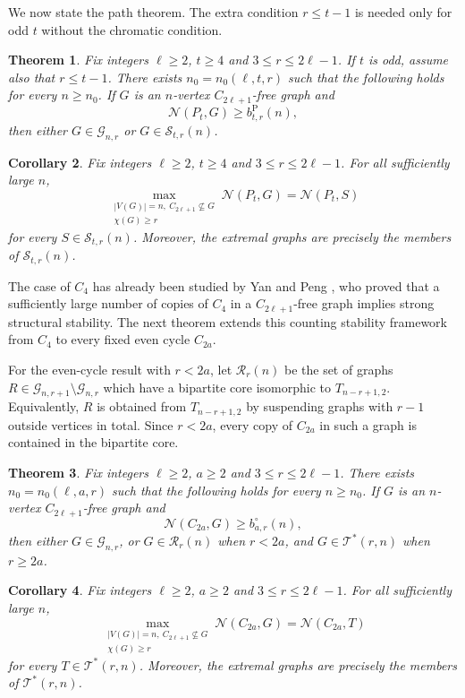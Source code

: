 \documentclass[11pt]{article}
\newtheorem{theorem}{Theorem}[section]
\newtheorem{corollary}[theorem]{Corollary}
\theoremstyle{definition}
\theoremstyle{plain}
\theoremstyle{remark}
\theoremstyle{plain}
\numberwithin{equation}{section}
\newcommand{\cG}{\mathcal G}
\newcommand{\cS}{\mathcal S}
\newcommand{\cT}{\mathcal T}
\newcommand{\cR}{\mathcal R}
\newcommand{\N}{\mathcal N}
\begin{document}
We now state the path theorem. The extra condition $r\le t-1$ is needed only for odd $t$ without the chromatic condition.

\begin{theorem}\label{thm:path-main}
Fix integers $\ell\ge2$, $t\ge4$ and $3\le r\le2\ell-1$. If $t$ is odd, assume also that $r\le t-1$. There exists $n_0=n_0(\ell,t,r)$ such that the following holds for every $n\ge n_0$. If $G$ is an $n$-vertex $C_{2\ell+1}$-free graph and
\[
        \N(P_t,G)\ge b^{\mathrm P}_{t,r}(n),
\]
then either $G\in\cG_{n,r}$ or $G\in\cS_{t,r}(n)$.
\end{theorem}

\begin{corollary}\label{cor:path-chromatic}
Fix integers $\ell\ge2$, $t\ge4$ and $3\le r\le2\ell-1$. For all sufficiently large $n$,
\[
        \max_{\substack{|V(G)|=n,\ C_{2\ell+1}\nsubseteq G\\ \chi(G)\ge r}} \N(P_t,G)=\N(P_t,S)
\]
for every $S\in\cS_{t,r}(n)$. Moreover, the extremal graphs are precisely the members of $\cS_{t,r}(n)$.
\end{corollary}

The case of $C_4$ has already been studied by Yan and Peng \cite{YanPengC42026}, who proved that a sufficiently large number of copies of $C_4$ in a $C_{2\ell+1}$-free graph implies strong structural stability. The next theorem extends this counting stability framework from $C_4$ to every fixed even cycle $C_{2a}$.

For the even-cycle result with $r<2a$, let $\cR_r(n)$ be the set of graphs $R\in\cG_{n,r+1}\setminus\cG_{n,r}$ which have a bipartite core isomorphic to $T_{n-r+1,2}$. Equivalently, $R$ is obtained from $T_{n-r+1,2}$ by suspending graphs with $r-1$ outside vertices in total. Since $r<2a$, every copy of $C_{2a}$ in such a graph is contained in the bipartite core.

\begin{theorem}\label{thm:cycle-main}
Fix integers $\ell\ge2$, $a\ge2$ and $3\le r\le2\ell-1$. There exists $n_0=n_0(\ell,a,r)$ such that the following holds for every $n\ge n_0$. If $G$ is an $n$-vertex $C_{2\ell+1}$-free graph and
\[
        \N(C_{2a},G)\ge b^{\circ}_{a,r}(n),
\]
then either $G\in\cG_{n,r}$, or $G\in\cR_r(n)$ when $r<2a$, and $G\in\cT^*(r,n)$ when $r\ge2a$.
\end{theorem}

\begin{corollary}\label{cor:cycle-chromatic}
Fix integers $\ell\ge2$, $a\ge2$ and $3\le r\le2\ell-1$. For all sufficiently large $n$,
\[
        \max_{\substack{|V(G)|=n,\ C_{2\ell+1}\nsubseteq G\\ \chi(G)\ge r}} \N(C_{2a},G)=\N(C_{2a},T)
\]
for every $T\in \cT^*(r,n)$. Moreover, the extremal graphs are precisely the members of $\cT^*(r,n)$.
\end{corollary}
\end{document}
